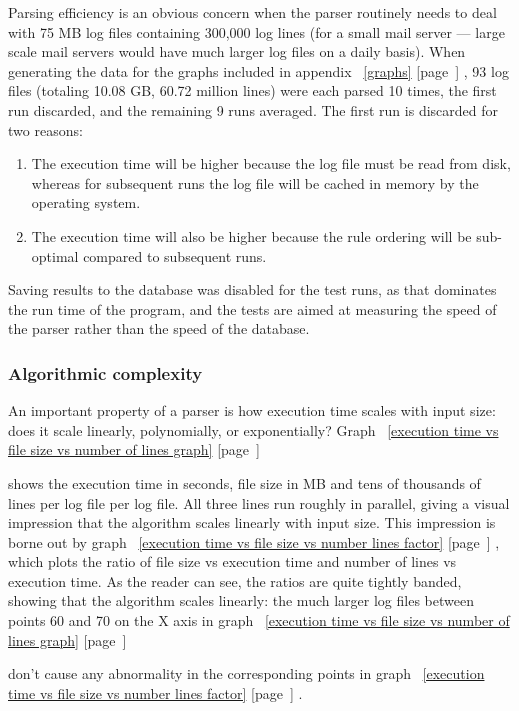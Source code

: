 \documentclass[a4paper,12pt,draft]{article}
\newcommand{\refwithpage}[1]{%
    \empty{}\ref{#1} [page~\pageref{#1}]%
}
\newcommand{\numberOFlogFILES}[0]{%
    93%
}
\begin{document}
\label{rule efficiency}

Parsing efficiency is an obvious concern when the parser routinely needs to
deal with 75 MB log files containing 300,000 log lines (for a small mail
server --- large scale mail servers would have much larger log files on a
daily basis).  When generating the data for the graphs included in
appendix~\refwithpage{graphs}, \numberOFlogFILES{} log files (totaling
10.08 GB, 60.72 million lines) were each parsed 10 times, the first run
discarded, and the remaining 9 runs averaged.  The first run is discarded
for two reasons:

\begin{enumerate}

    \item The execution time will be higher because the log file must be
        read from disk, whereas for subsequent runs the log file will be
        cached in memory by the operating system.

    \item The execution time will also be higher because the rule ordering
        will be sub-optimal compared to subsequent runs.

\end{enumerate}

Saving results to the database was disabled for the test runs, as that
dominates the run time of the program, and the tests are aimed at measuring
the speed of the parser rather than the speed of the database.

\subsubsection{Algorithmic complexity}

An important property of a parser is how execution time scales with input
size: does it scale linearly, polynomially, or exponentially?
Graph~\refwithpage{execution time vs file size vs number of lines graph}
shows the execution time in seconds, file size in MB and tens of thousands
of lines per log file per log file.  All three lines run roughly in
parallel, giving a visual impression that the algorithm scales linearly
with input size.  This impression is borne out by
graph~\refwithpage{execution time vs file size vs number lines factor},
which plots the ratio of file size vs execution time and number of lines vs
execution time.  As the reader can see, the ratios are quite tightly
banded, showing that the algorithm scales linearly: the much larger log
files between points 60 and 70 on the X axis in
graph~\refwithpage{execution time vs file size vs number of lines graph}
don't cause any abnormality in the corresponding points in
graph~\refwithpage{execution time vs file size vs number lines factor}.
\end{document}
